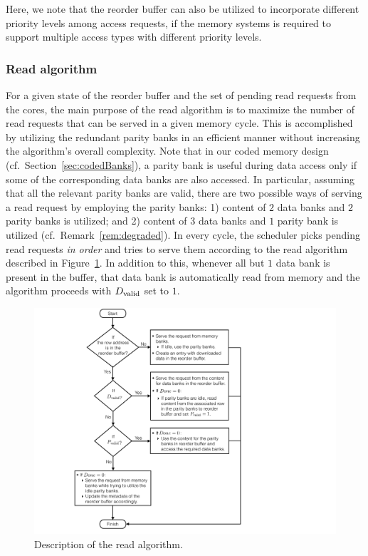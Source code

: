 \begin{remark}
\label{rem:priority}
Here, we note that the reorder buffer can also be utilized to incorporate different priority levels among access requests, if the memory systems is required to support multiple access types with different priority levels.
\end{remark}


\subsubsection{Read algorithm}
\label{sec:read}
For a given state of the reorder buffer and the set of pending read requests from the cores, the main purpose of the read algorithm is to maximize the number of read requests that can be served in a given memory cycle. This is accomplished by utilizing the redundant parity banks in an efficient manner without increasing the algorithm's overall complexity. Note that in our coded memory design (cf.~Section~\ref{sec:codedBanks}), a parity bank is useful during data access only if some of the corresponding data banks are also accessed. In particular, assuming that all the relevant parity banks are valid, there are two possible ways of serving a read request by employing the parity banks: 1) content of $2$ data banks and $2$ parity banks is utilized; and  2) content of $3$ data banks and $1$ parity bank is utilized (cf.~Remark~\ref{rem:degraded}). In every cycle, the scheduler picks pending read requests {\em in order} and tries to serve them according to the read algorithm described in Figure~\ref{fig:read}. In addition to this, whenever all but $1$ data bank is present in the buffer, that data bank is automatically read from memory and the algorithm proceeds with $D_{\rm valid}$ set to $1$.
\begin{figure}[h!] \centering
\includegraphics[width=0.85\linewidth]{figures/Read-algo-new.pdf} 
\caption{Description of the read algorithm.}
\label{fig:read}
\end{figure}

